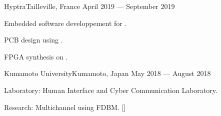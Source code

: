 
    {Hyptra}{Tailleville, France}
    {April 2019 --- September 2019}
    {\begin{additems}
        \item Embedded software developpement for .
        \item PCB design using .
        \item FPGA synthesis on .
    \end{additems}}

    {Kumamoto University}{Kumamoto, Japan}
    {May 2018 --- August 2018}
    {\begin{additems} %
        \item Laboratory: Human Interface and Cyber Communication Laboratory.
        \item Research: Multichannel  using FDBM. []
    \end{additems}}
